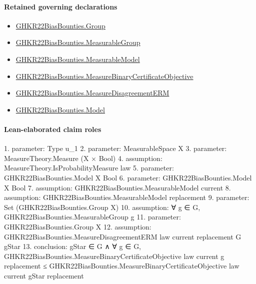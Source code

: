 \documentclass[10pt]{article}
\begin{document}
\paragraph{Retained governing declarations}
\begin{itemize}\raggedright
\item \hyperlink{paper-prerequisite-cc7214115b27106f}{GHKR22\allowbreak{}Bias\allowbreak{}Bounties.\allowbreak{}Group}
\item \hyperlink{governing-declaration-8d5012d60e076f7c}{GHKR22\allowbreak{}Bias\allowbreak{}Bounties.\allowbreak{}Measurable\allowbreak{}Group}
\item \hyperlink{governing-declaration-8b721c00962c326a}{GHKR22\allowbreak{}Bias\allowbreak{}Bounties.\allowbreak{}Measurable\allowbreak{}Model}
\item \hyperlink{governing-declaration-d01ac455a50eb103}{GHKR22\allowbreak{}Bias\allowbreak{}Bounties.\allowbreak{}Measure\allowbreak{}Binary\allowbreak{}Certificate\allowbreak{}Objective}
\item \hyperlink{governing-declaration-123fc441763c6675}{GHKR22\allowbreak{}Bias\allowbreak{}Bounties.\allowbreak{}Measure\allowbreak{}Disagreement\allowbreak{}ERM}
\item \hyperlink{paper-prerequisite-333127605c12eba8}{GHKR22\allowbreak{}Bias\allowbreak{}Bounties.\allowbreak{}Model}
\end{itemize}
\paragraph{Lean-elaborated claim roles}\begin{ReviewVerbatim}
1. parameter: Type u_1
2. parameter: MeasurableSpace X
3. parameter: MeasureTheory.Measure (X × Bool)
4. assumption: MeasureTheory.IsProbabilityMeasure law
5. parameter: GHKR22BiasBounties.Model X Bool
6. parameter: GHKR22BiasBounties.Model X Bool
7. assumption: GHKR22BiasBounties.MeasurableModel current
8. assumption: GHKR22BiasBounties.MeasurableModel replacement
9. parameter: Set (GHKR22BiasBounties.Group X)
10. assumption: ∀ g ∈ G, GHKR22BiasBounties.MeasurableGroup g
11. parameter: GHKR22BiasBounties.Group X
12. assumption: GHKR22BiasBounties.MeasureDisagreementERM law current replacement G gStar
13. conclusion: gStar ∈ G ∧
  ∀ g ∈ G,
    GHKR22BiasBounties.MeasureBinaryCertificateObjective law current g replacement ≤
      GHKR22BiasBounties.MeasureBinaryCertificateObjective law current gStar replacement
\end{ReviewVerbatim}
\end{document}
